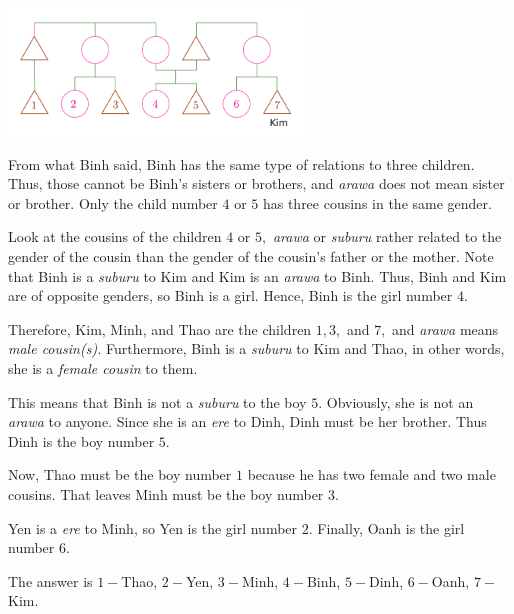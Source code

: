 \documentclass{article}
\begin{document}
\begin{center}
    \begin{minipage}[t]{8cm}
        \centering
        \includegraphics[width=8cm]{./svg/pdf/hc-2022-2-3-15-2.pdf}
    \end{minipage}
\end{center}

\begin{soln}
    From what Binh said, Binh has the same type of relations to three children.
    Thus, those cannot be Binh's sisters or brothers,
    and \textit{arawa} does not mean sister or brother.
    Only the child number $4$ or $5$ has three cousins in the same gender.

    Look at the cousins of the children $4$ or $5,$
    \textit{arawa} or \textit{suburu} rather related to the gender of the cousin
    than the gender of the cousin's father or the mother.
    Note that Binh is a \textit{suburu} to Kim and Kim is an \textit{arawa} to Binh.
    Thus, Binh and Kim are of opposite genders, so Binh is a girl.
    Hence, Binh is the girl number $4.$

    Therefore, Kim, Minh, and Thao are the children $1, 3,$ and $7,$
    and \textit{arawa} means \textit{male cousin(s).}
    Furthermore, Binh is a \textit{suburu} to Kim and Thao,
    in other words, she is a \textit{female cousin} to them.

    This means that Binh is not a \textit{suburu} to the boy $5.$
    Obviously, she is not an \textit{arawa} to anyone.
    Since she is an \textit{ere} to Dinh, Dinh must be her brother.
    Thus Dinh is the boy number $5.$
    
    Now, Thao must be the boy number $1$ because he has two female and two male cousins.
    That leaves Minh must be the boy number $3.$

    Yen is a \textit{ere} to Minh, so Yen is the girl number $2.$
    Finally, Oanh is the girl number $6.$

    The answer is $1-$Thao, $2-$Yen, $3-$Minh, $4-$Binh, $5-$Dinh, $6-$Oanh, $7-$Kim.  
\end{soln}
\end{document}
